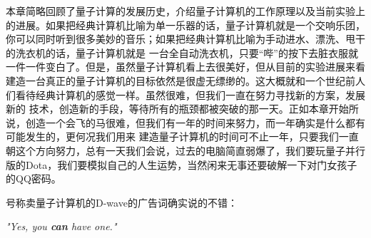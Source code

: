本章简略回顾了量子计算的发展历史，介绍量子计算机的工作原理以及当前实验上的进展。如果把经典计算机比喻为单一乐器的话，量子计算机就是一个交响乐团，你可以同时听到很多美妙的音乐；如果把经典计算机比喻为手动进水、漂洗、甩干的洗衣机的话，量子计算机就是
一台全自动洗衣机，只要“哔”的按下去脏衣服就一件一件变白了。但是，虽然量子计算机看上去很美好，但从目前的实验进展来看
建造一台真正的量子计算机的目标依然是很虚无缥缈的。这大概就和一个世纪前人们看待经典计算机的感觉一样。虽然很难，但我们一直在努力寻找新的方案，发展新的
技术，创造新的手段，等待所有的瓶颈都被突破的那一天。正如本章开始所说，创造一个会飞的马很难，但我们有一年的时间来努力，而一年确实是什么都有可能发生的，更何况我们用来
建造量子计算机的时间可不止一年，只要我们一直朝这个方向努力，总有一天我们会说，过去的电脑简直弱爆了，我们要玩量子并行版的Dota，我们要模拟自己的人生运势，当然闲来无事还要破解一下对门女孩子的QQ密码。

号称卖量子计算机的D-wave的广告词确实说的不错：

\emph{"Yes, you \textbf{can} have one."}


